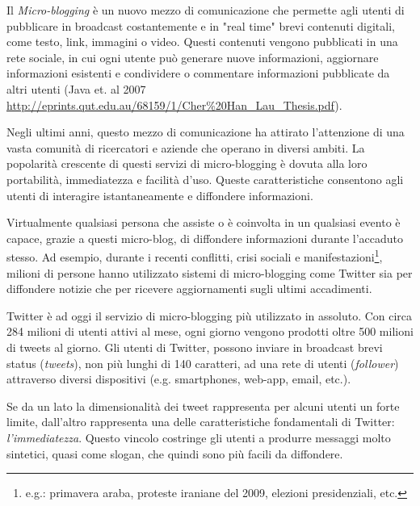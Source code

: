 



Il \emph{Micro-blogging} è un nuovo mezzo di comunicazione che permette agli utenti di pubblicare in broadcast  costantemente e in  "real time" brevi contenuti digitali, come testo, link, immagini o video. 
Questi contenuti vengono pubblicati in una rete sociale, in cui ogni utente può generare nuove informazioni, aggiornare informazioni esistenti e condividere o commentare informazioni pubblicate da altri utenti \cite{} (Java et. al 2007 \url{http://eprints.qut.edu.au/68159/1/Cher%20Han_Lau_Thesis.pdf}).  

Negli ultimi anni, questo mezzo di comunicazione ha attirato l'attenzione di una vasta  comunità  di ricercatori e aziende che operano in diversi ambiti.
La popolarità crescente di questi servizi di micro-blogging è dovuta alla loro portabilità, immediatezza e facilità d'uso. Queste caratteristiche consentono agli utenti di interagire istantaneamente e diffondere informazioni.

Virtualmente qualsiasi persona che assiste o è coinvolta in un qualsiasi evento è capace, grazie a questi micro-blog, di diffondere informazioni durante l'accaduto stesso. Ad esempio, durante i recenti conflitti, crisi sociali e manifestazioni\footnote{e.g.: primavera araba, proteste iraniane del 2009, elezioni presidenziali, etc.}, milioni di persone hanno utilizzato sistemi di micro-blogging come Twitter sia per diffondere notizie che per ricevere aggiornamenti sugli ultimi accadimenti.

Twitter è ad oggi il servizio di micro-blogging più utilizzato in assoluto. Con circa 284 milioni di utenti attivi al mese, ogni giorno vengono prodotti oltre 500 milioni di tweets al giorno. Gli utenti di Twitter, possono inviare in broadcast brevi status (\emph{tweets}), non  più lunghi di 140 caratteri,
 ad una rete di utenti (\emph{follower}) attraverso diversi dispositivi (e.g. smartphones, web-app, email, etc.).
 
Se da un lato la dimensionalità dei tweet rappresenta per alcuni utenti un forte limite, dall'altro rappresenta una delle caratteristiche fondamentali di Twitter: \emph{l'immediatezza}. Questo vincolo costringe gli utenti a produrre messaggi molto sintetici, quasi come slogan, che quindi sono più facili da diffondere.

